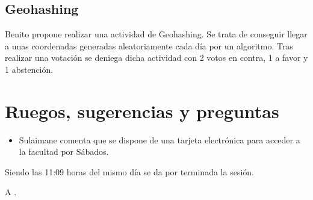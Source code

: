 \documentclass[12pt,twoside,openany,a4paper]{book}
\begin{document}
    \subsection{Geohashing}
    Benito propone realizar una actividad de Geohashing. Se trata de conseguir llegar a unas coordenadas generadas aleatoriamente cada día por un algoritmo. Tras realizar una votación se deniega dicha actividad con 2 votos en contra, 1 a favor y 1 abstención.


    \section{Ruegos, sugerencias y preguntas}
    \begin{itemize}
        \item Sulaimane comenta que se dispone de una tarjeta electrónica para acceder a la facultad por Sábados.
    \end{itemize}


    \clearpage
    Siendo las 11:09 horas del mismo día se da por terminada la sesión.

    A \Date.
    \vspace{10mm}
\end{document}

